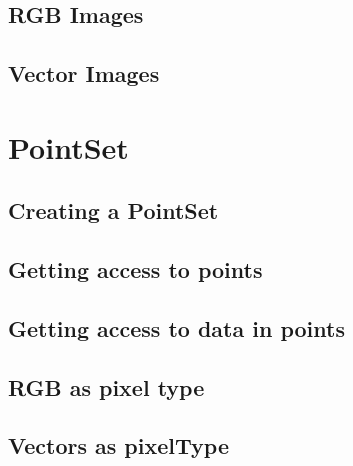 


\subsection{RGB Images}
\label{sec:DefiningRGBImages}




\subsection{Vector Images}
\label{sec:DefiningVectorImages}





\section{PointSet}
\label{PointSetSection}

\subsection{Creating a PointSet}
\label{sec:CreatingAPointSet}





\subsection{Getting access to points}
\label{sec:GettingAccessToPointsInThePointSet}





\subsection{Getting access to data in points}
\label{sec:GettingAccessToDataInThePointSet}





\subsection{RGB as pixel type}
\label{sec:PointSetWithRGBAsPixelType}






\subsection{Vectors as pixelType}
\label{sec:PointSetWithVectorsAsPixelType}


